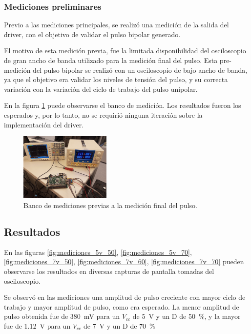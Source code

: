 \subsubsection{Mediciones preliminares}

Previo a las mediciones principales, se realizó una medición de la salida del driver,
con el objetivo de validar el pulso bipolar generado.

El motivo de esta medición previa, fue la limitada disponibilidad del
osciloscopio de gran ancho de banda utilizado para la medición final del pulso.
Esta pre-medición del pulso bipolar se realizó con un osciloscopio de bajo ancho
de banda, ya que el objetivo era validar los niveles de tensión del pulso, y su
correcta variación con la variación del ciclo de trabajo del pulso unipolar.

En la figura \ref{fig:banco_pre_mediciones} puede observarse el banco de
medición. Los resultados fueron los esperados y, por lo tanto, no se requirió
ninguna iteración sobre la implementación del driver.

\begin{figure}
  \centering
    \includegraphics[width=0.4\textwidth]{images/banco_pre_mediciones.jpg}
    \caption{Banco de mediciones previas a la medición final del pulso.}
    \label{fig:banco_pre_mediciones}
\end{figure}

\subsection{Resultados}

En las figuras \ref{fig:mediciones_5v_50}, \ref{fig:mediciones_5v_70},
\ref{fig:mediciones_7v_50}, \ref{fig:mediciones_7v_60},
\ref{fig:mediciones_7v_70} pueden observarse los resultados en diversas capturas de pantalla
tomadas del osciloscopio.

Se observó en las mediciones una amplitud de pulso creciente con mayor ciclo de
trabajo y mayor amplitud de pulso, como era esperado. La menor amplitud de pulso
obtenida fue de \qty{380}{\milli\volt} para un $V_{cc}$ de \qty{5}{\volt} y un D
de \qty{50}{\percent}, y la mayor fue de \qty{1.12}{\volt} para un $V_{cc}$
de \qty{7}{\volt} y un D de \qty{70}{\percent}

